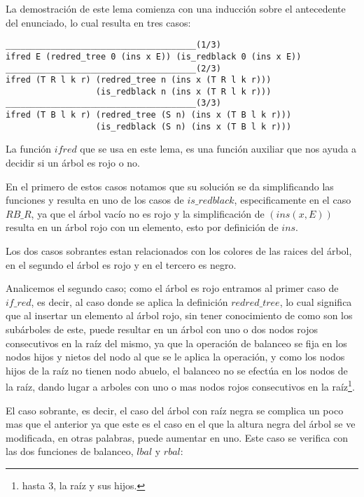La demostraci\'on de este lema comienza con una inducci\'on sobre el antecedente del enunciado, lo 
cual resulta en tres casos:

 \begin{verbatim}
______________________________________(1/3)
ifred E (redred_tree 0 (ins x E)) (is_redblack 0 (ins x E))
______________________________________(2/3)
ifred (T R l k r) (redred_tree n (ins x (T R l k r)))
                  (is_redblack n (ins x (T R l k r)))
______________________________________(3/3)
ifred (T B l k r) (redred_tree (S n) (ins x (T B l k r)))
                  (is_redblack (S n) (ins x (T B l k r)))
 \end{verbatim}

La funci\'on $ifred$ que se usa en este lema, es una funci\'on auxiliar que nos ayuda a decidir si
un \'arbol es rojo o no.

En el primero de estos casos notamos que su soluci\'on se da simplificando las funciones y resulta
en uno de los casos de \hyperref[inductive_isRedB]{$is\_redblack$}, especificamente en el caso 
$RB\_R$, ya que el \'arbol vacío no es rojo y la simplificaci\'on de $(ins(x,E))$ resulta en un 
\'arbol rojo con un elemento, esto por definici\'on de \hyperref[func_ins]{$ins$}.

Los dos casos sobrantes estan relacionados con los colores de las raices del \'arbol, en el
segundo el \'arbol es rojo y en el tercero es negro.

Analicemos el segundo caso; como el \'arbol es rojo entramos al primer caso de $if\_red$, es decir,
al caso donde se aplica la definici\'on \hyperref[inductive_isRedB]{$redred\_tree$}, lo cual 
significa que al insertar un elemento al \'arbol rojo, sin tener conocimiento de como son los 
subárboles de este, puede resultar en un \'arbol con uno o dos nodos rojos consecutivos en la ra\'iz 
del mismo, ya que la operaci\'on de balanceo se fija en los nodos hijos y nietos del nodo al que se 
le aplica la operaci\'on, y como los nodos hijos de la raíz no tienen nodo abuelo, el balanceo no se 
efectúa en los nodos de la raíz, dando lugar a arboles con uno o mas nodos rojos consecutivos en la 
raíz\footnote{hasta 3, la raíz y sus hijos.}.

El caso sobrante, es decir, el caso del \'arbol con raíz negra se complica un poco mas que el 
anterior ya que este es el caso en el que la altura negra del \'arbol se ve modificada, en otras 
palabras, puede aumentar en uno. Este caso se verifica con las dos funciones de balanceo, 
\hyperref[func_balanceo]{$lbal$} y \hyperref[func_balanceo]{$rbal$}:

